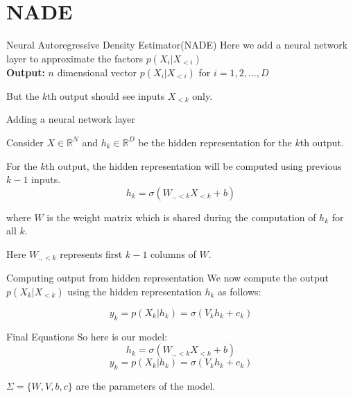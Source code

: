 \section*{NADE}

\begin{frame}{Neural Autoregressive Density Estimator(NADE)}
    Here we add a neural network layer to approximate the factors $p(X_i|X_{<i})$ \\

    \textbf{Output: } $n$ dimensional vector $p(X_i|X_{<i})$ for $i=1,2,...,D$ \\

    \bigskip

    But the $k$th output should see inputs $X_{<k}$ only. \\
\end{frame}

\begin{frame}{Adding a neural network layer}

    Consider $X \in \mathbb{R}^N$ and $h_k \in \mathbb{R}^D$ be the hidden representation for the $k$th output. \\
    \bigskip

    For the $k$th output, the hidden representation will be computed using previous $k-1$ inputs. \\

    \[ \boxed{h_k = \sigma(W_{.,<k}X_{<k} + b)} \]

    where $W$ is the weight matrix which is shared during the computation of $h_k$ for all $k$. \\

    \bigskip

    Here $W_{.,<k}$ represents first $k-1$ columns of $W$.
\end{frame}

\begin{frame}{Computing output from hidden representation}
    We now compute the output $p(X_k|X_{<k})$ using the hidden representation $h_k$ as follows: 
    
    \bigskip

    \[ y_k = p(X_k | h_k) = \sigma(V_kh_k + c_k) \]
    
\end{frame}

\begin{frame}{Final Equations}
    So here is our model: \\
    
    \[ h_k = \sigma(W_{.,<k}X_{<k} + b) \]
    \[ y_k = p(X_k | h_k) = \sigma(V_kh_k + c_k) \]

    $\Sigma = \{ W, V, b, c \}$ are the parameters of the model. \\

\end{frame}


